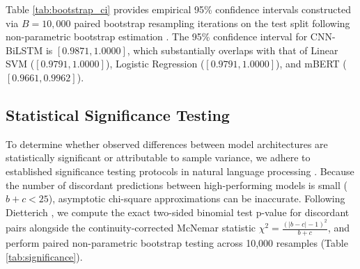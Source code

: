 \documentclass[11pt,a4paper]{article}
\begin{document}
Table \ref{tab:bootstrap_ci} provides empirical 95\% confidence intervals constructed via $B = 10,000$ paired bootstrap resampling iterations on the test split following non-parametric bootstrap estimation \cite{efron1994introduction}. The 95\% confidence interval for CNN-BiLSTM is $[0.9871, 1.0000]$, which substantially overlaps with that of Linear SVM ($[0.9791, 1.0000]$), Logistic Regression ($[0.9791, 1.0000]$), and mBERT ($[0.9661, 0.9962]$).

\begin{table}[t]
\centering
\small
\caption{\textbf{Paired bootstrap 95\% confidence intervals ($B = 10,000$ iterations) on the held-out test split.}}
\label{tab:bootstrap_ci}
\end{table}

\subsection{Statistical Significance Testing}
To determine whether observed differences between model architectures are statistically significant or attributable to sample variance, we adhere to established significance testing protocols in natural language processing \cite{dror2018hitchhiker}. Because the number of discordant predictions between high-performing models is small ($b + c < 25$), asymptotic chi-square approximations can be inaccurate. Following Dietterich \cite{dietterich1998approximate}, we compute the exact two-sided binomial test p-value for discordant pairs alongside the continuity-corrected McNemar statistic $\chi^2 = \frac{(|b - c| - 1)^2}{b + c}$, and perform paired non-parametric bootstrap testing across 10,000 resamples (Table \ref{tab:significance}).
\end{document}
